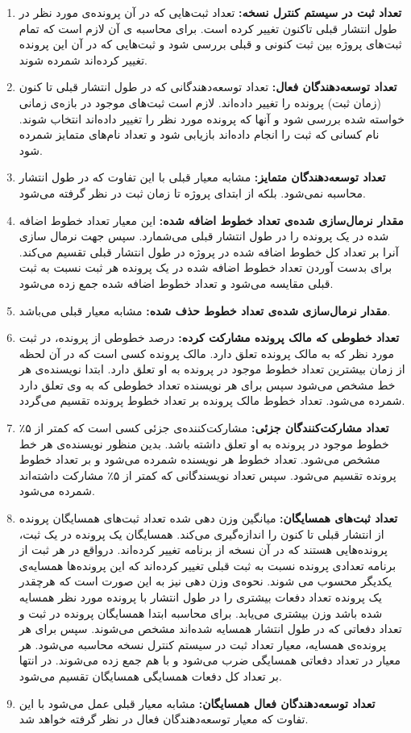 \begin{enumerate}
	\item
	\textbf{تعداد ثبت در سیستم کنترل نسخه:}
	تعداد ثبت‌هایی که در آن پرونده‌ی ‌مورد نظر در طول انتشار قبلی تاکنون تغییر کرده است. برای محاسبه ی آن لازم است که تمام ثبت‌های پروژه بین ثبت کنونی و  قبلی بررسی شود و ثبت‌هایی که در آن این پرونده تغییر کرده‌اند شمرده شوند.
	\item
	\textbf{تعداد توسعه‌دهندگان 
		فعال:}
	تعداد توسعه‌دهندگانی که در طول انتشار قبلی تا کنون (زمان ثبت) پرونده را تغییر داده‌اند. لازم است ثبت‌های موجود در باز‌ه‌ی زمانی خواسته شده بررسی شود و آنها که پرونده مورد نظر را تغییر داده‌اند انتخاب شوند. نام کسانی که ثبت را انجام داده‌اند بازیابی شود و تعداد نام‌های متمایز شمرده شود. 
	\item
	\textbf{تعداد توسعه‌دهندگان	متمایز:}
	مشابه معیار قبلی با این تفاوت که در طول انتشار محاسبه نمی‌شود. بلکه از ابتدای پروژه تا زمان ثبت در نظر گرفته می‌شود. 
	\item
	\textbf{مقدار نرمال‌سازی شده‌ی تعداد خطوط اضافه شده:}
	این معیار تعداد خطوط اضافه شده در یک پرونده را در طول انتشار قبلی می‌شمارد. سپس جهت نرمال سازی آنرا بر تعداد کل خطوط اضافه شده در پروژه در طول انتشار قبلی تقسیم می‌کند. برای بدست آوردن تعداد خطوط اضافه شده در یک پرونده هر ثبت نسبت به ثبت قبلی مقایسه می‌شود و تعداد خطوط اضافه شده جمع زده می‌شود.
	\item
	\textbf{مقدار نرمال‌سازی شده‌ی تعداد خطوط حذف شده:}
	مشابه معیار قبلی می‌باشد. 
	\item
	\textbf{تعداد خطوطی که مالک پرونده مشارکت کرده:}
	درصد خطوطی  از پرونده، در  ثبت مورد نظر  که به مالک پرونده تعلق دارد. مالک پرونده کسی است که در آن لحظه از زمان بیشترین تعداد خطوط موجود در پرونده به او تعلق دارد. ابتدا نویسنده‌ی هر خط مشخص می‌شود سپس برای هر نویسنده تعداد خطوطی که به وی تعلق دارد شمرده می‌شود. تعداد خطوط مالک پرونده بر تعداد خطوط پرونده تقسیم می‌گردد.
	\item
	\textbf{تعداد مشارکت‌کنندگان جزئی:}
	مشارکت‌کننده‌ی جزئی کسی است که کمتر از ۵٪ خطوط موجود در پرونده به او تعلق داشته باشد. بدین منظور نویسنده‌ی هر خط مشخص می‌شود. تعداد خطوط هر نویسنده شمرده می‌شود و بر تعداد خطوط پرونده تقسیم می‌شود. سپس تعداد نویسندگانی که کمتر از ۵٪ مشارکت داشته‌اند شمرده می‌شود. 
	\item
	\textbf{تعداد ثبت‌های همسایگان:}
	میانگین وزن دهی شده تعداد ثبت‌های همسایگان پرونده از انتشار قبلی تا کنون را اندازه‌گیری می‌کند. همسایگان یک پرونده در یک ثبت، پرونده‌هایی هستند که در آن نسخه از برنامه تغییر کرده‌اند. در‌واقع در هر ثبت از برنامه تعدادی پرونده نسبت به ثبت قبلی تغییر کرده‌اند که این پرونده‌ها همسایه‌ی یکدیگر محسوب می شوند. نحوه‌ی وزن دهی نیز به این صورت است که هرچقدر یک پرونده تعداد دفعات بیشتری را در طول انتشار با پرونده مورد نظر همسایه شده باشد وزن بیشتری می‌یابد. برای محاسبه ابتدا همسایگان پرونده در ثبت  و تعداد دفعاتی که  در طول انتشار همسایه شده‌اند مشخص می‌شوند. سپس برای هر پرونده‌ی همسایه، معیار تعداد ثبت در سیستم کنترل نسخه محاسبه می‌شود. هر معیار در تعداد دفعاتی همسایگی ضرب می‌شود و با هم جمع زده می‌شوند. در انتها بر تعداد کل دفعات همسایگی همسایگان تقسیم می‌شود. 
	\item
	\textbf{تعداد توسعه‌دهندگان فعال همسایگان:}
	مشابه معیار قبلی عمل می‌شود با این تفاوت که معیار توسعه‌دهندگان فعال در نظر گرفته خواهد شد.
	

\end{enumerate}
